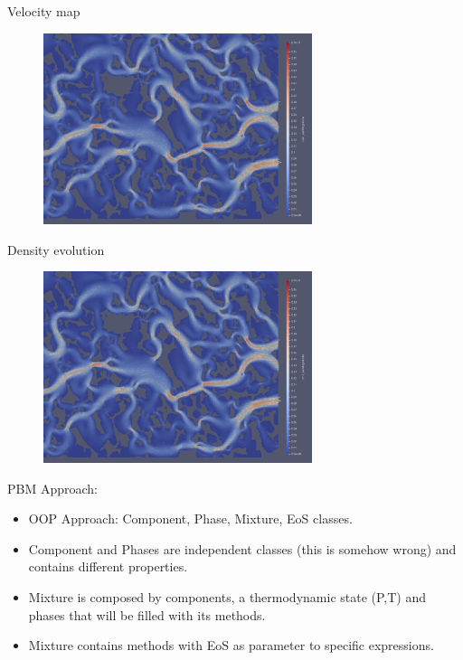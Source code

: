 \documentclass{beamer}
\begin{document}
	\begin{frame}{Velocity map}
		\begin{figure}
			\centering
			\includegraphics[width=0.7\textwidth]{pics/pmVelLowerRight.png}  
		\end{figure}
	\end{frame}
	\begin{frame}{Density evolution}
		\begin{figure}
			\centering
			\includegraphics[width=0.7\textwidth]{pics/pmVelLowerRight.png}  
		\end{figure}
	\end{frame}

	\begin{frame}{PBM}
		Approach:
		\begin{itemize}
			\item OOP Approach: Component, Phase, Mixture, EoS classes.
			\item Component and Phases are independent classes (this is somehow wrong) and contains different properties.
			\item Mixture is composed by components, a thermodynamic state (P,T) and phases that will be filled with its methods.
			\item Mixture contains methods with EoS as parameter to specific expressions.
		\end{itemize}
	\end{frame}
\end{document}
